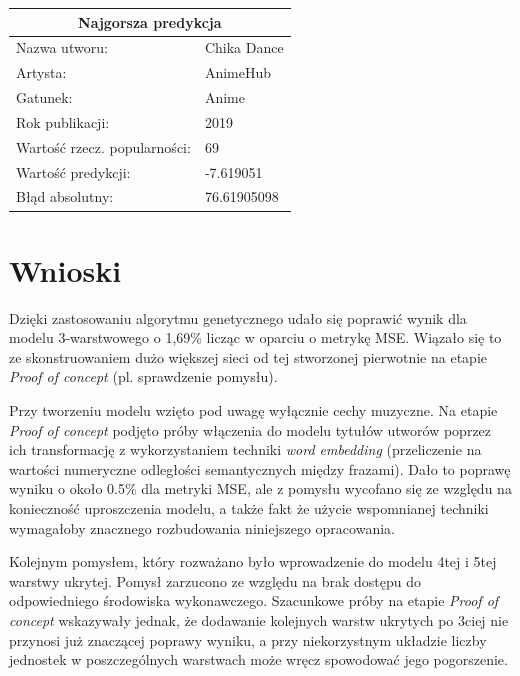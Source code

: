 \documentclass[a4paper,12pt]{article}
\numberwithin{figure}{section}
\begin{document}
    \smallskip

    \noindent
    \begin{minipage}[H]{\textwidth}
        \begin{tabular}{|p{}|p{}|}
            \hline
            \multicolumn{2}{|c|}{Najgorsza predykcja} \\
            \hline
            Nazwa utworu:                & Chika Dance \\
            Artysta:                     & AnimeHub    \\
            Gatunek:                     & Anime       \\
            Rok publikacji:              & 2019        \\
            Wartość rzecz. popularności: & 69          \\
            Wartość predykcji:           & -7.619051   \\
            Błąd absolutny:              & 76.61905098 \\
            \hline
        \end{tabular}
    \end{minipage}

    \newpage


    \section{Wnioski}

    Dzięki zastosowaniu algorytmu genetycznego udało się poprawić wynik dla modelu 3-warstwowego o 1,69\% licząc w oparciu o metrykę MSE. Wiązało się to ze skonstruowaniem dużo większej sieci od tej stworzonej pierwotnie na etapie \textit{Proof of concept} (pl. sprawdzenie pomysłu).

    \bigskip

    Przy tworzeniu modelu wzięto pod uwagę wyłącznie cechy muzyczne. Na etapie \textit{Proof of concept} podjęto próby włączenia do modelu tytułów utworów poprzez ich transformację z wykorzystaniem techniki \textit{word embedding} (przeliczenie na wartości numeryczne odległości semantycznych między frazami). Dało to poprawę wyniku o około 0.5\% dla metryki MSE, ale z pomysłu wycofano się ze względu na konieczność uproszczenia modelu, a także fakt że użycie wspomnianej techniki wymagałoby znacznego rozbudowania niniejszego opracowania.

    \bigskip

    Kolejnym pomysłem, który rozważano było wprowadzenie do modelu 4tej i 5tej warstwy ukrytej. Pomysł zarzucono ze względu na brak dostępu do odpowiedniego środowiska wykonawczego. Szacunkowe próby na etapie \textit{Proof of concept} wskazywały jednak, że dodawanie kolejnych warstw ukrytych po 3ciej nie przynosi już znaczącej poprawy wyniku, a przy niekorzystnym układzie liczby jednostek w poszczególnych warstwach może wręcz spowodować jego pogorszenie.
\end{document}
